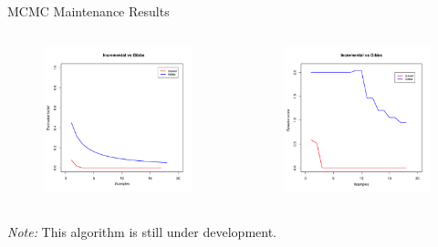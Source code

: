 \documentclass[onlymath,xcolor=pdftex,dvipsnames,table]{beamer}
\begin{document}
\begin{frame}{MCMC Maintenance Results}
\begin{columns}[c]
  \begin{figure}
    \centering
    \includegraphics[width=\linewidth]{inc1.pdf}
  \end{figure}

  \begin{figure}
    \includegraphics[width=\linewidth]{inc2.pdf}
  \end{figure}
\end{columns}

\textit{Note:} This algorithm is still under development.
\end{frame}
\end{document}
